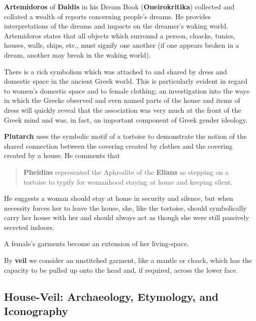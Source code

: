 \textbf{Artemidoros} of \textbf{Daldis} in his Dream Book (\textbf{Oneirokritika}) collected and collated a wealth of reports concerning people's dreams. He provides interpretations of the dreams and impacts on the dreamer's waking world. Artemidoros states that all objects which surround a person, cloacks, tunics, houses, walls, ships, etc., must signify one another (if one appears broken in a dream, another may break in the waking world).

\begin{rmk}
    There is a rich symbolism which was attached to and shared by dress and domestic space in the ancient Greek world. This is particularly evident in regard to women's domestic space and to female clothing; an investigation into the ways in which the Greeks observed and even named parts of the house and items of dress will quickly reveal that the association was very much at the front of the Greek mind and was, in fact, an important component of Greek gender ideology.
\end{rmk}

\textbf{Plutarch} uses the symbolic motif of a tortoise to demonstrate the notion of the shared connection between the covering created by clothes and the covering created by a house. He comments that 

\begin{quotation}
    \textbf{Pheidias} represented the Aphrodite of the \textbf{Elians} as stepping on a tortoise to typify for womanhood staying at home and keeping silent.
\end{quotation}

He suggests a woman should stay at home in security and silence, but when necessity forces her to leave the house, she, like the tortoise, should symbolically carry her house with her and should always act as though she were still passively secreted indoors.

\begin{nte}
    A female's garments become an extension of her living-space.
\end{nte}

By \textbf{veil} we consider an unstitched garment, like a mantle or cloack, which has the capacity to be pulled up onto the head and, if required, across the lower face. 


\subsection{House-Veil: Archaeology, Etymology, and Iconography}

